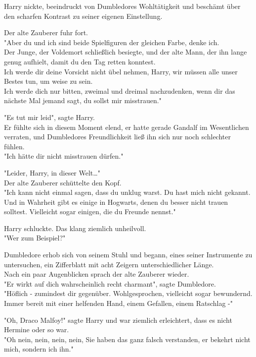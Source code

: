 {Harry nickte, beeindruckt von Dumbledores Wohltätigkeit und beschämt über den scharfen Kontrast zu seiner eigenen Einstellung.

Der alte Zauberer fuhr fort.\\ "Aber du und ich sind beide Spielfiguren der gleichen Farbe, denke ich.\\ Der Junge, der Voldemort schließlich besiegte, und der alte Mann, der ihn lange genug aufhielt, damit du den Tag retten konntest.\\ Ich werde dir deine Vorsicht nicht übel nehmen, Harry, wir müssen alle unser Bestes tun, um weise zu sein.\\ Ich werde dich nur bitten, zweimal und dreimal nachzudenken, wenn dir das nächste Mal jemand sagt, du sollst mir misstrauen."

"Es tut mir leid", sagte Harry.\\ Er fühlte sich in diesem Moment elend, er hatte gerade Gandalf im Wesentlichen verraten, und Dumbledores Freundlichkeit ließ ihn sich nur noch schlechter fühlen.\\ "Ich hätte dir nicht misstrauen dürfen."

"Leider, Harry, in dieser Welt…"\\ Der alte Zauberer schüttelte den Kopf.\\ "Ich kann nicht einmal sagen, dass du unklug warst. Du hast mich nicht gekannt. Und in Wahrheit gibt es einige in Hogwarts, denen du besser nicht trauen solltest. Vielleicht sogar einigen, die du Freunde nennst."

Harry schluckte. Das klang ziemlich unheilvoll.\\ "Wer zum Beispiel?"

Dumbledore erhob sich von seinem Stuhl und begann, eines seiner Instrumente zu untersuchen, ein Zifferblatt mit acht Zeigern unterschiedlicher Länge.\\ Nach ein paar Augenblicken sprach der alte Zauberer wieder.\\ "Er wirkt auf dich wahrscheinlich recht charmant", sagte Dumbledore.\\ "Höflich - zumindest dir gegenüber. Wohlgesprochen, vielleicht sogar bewundernd. Immer bereit mit einer helfenden Hand, einem Gefallen, einem Ratschlag -"

"Oh, Draco Malfoy!" sagte Harry und war ziemlich erleichtert, dass es nicht Hermine oder so war.\\ "Oh nein, nein, nein, nein, Sie haben das ganz falsch verstanden, er bekehrt nicht mich, sondern ich ihn."

}
